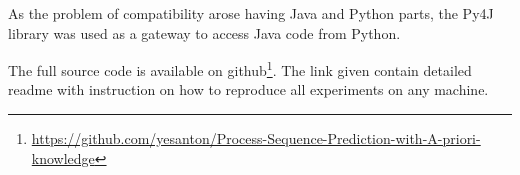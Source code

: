 As the problem of compatibility arose having Java and Python parts, the Py4J library\cite{py4j} was used as a gateway to access Java code from Python.

The full source code is available on github\footnote{\url{https://github.com/yesanton/Process-Sequence-Prediction-with-A-priori-knowledge}}. The link given contain detailed readme with instruction on how to reproduce all experiments on any machine. 

%
%
%
%






